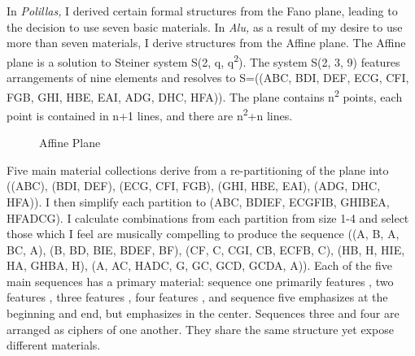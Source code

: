 In \textit{Polillas,} I derived certain formal structures from the Fano plane, leading to the decision to use seven basic materials. In \textit{Alu,} as a result of my desire to use more than seven materials, I derive structures from the Affine plane. The Affine plane is a solution to Steiner system S(2, q, q\textsuperscript{2}). The system S(2, 3, 9) features arrangements of nine elements and resolves to S=((ABC, BDI, DEF, ECG, CFI, FGB, GHI, HBE, EAI, ADG, DHC, HFA)). The plane contains n\textsuperscript{2} points, each point is contained in n+1 lines, and there are n\textsuperscript{2}+n lines.

\begin{figure}[H]
    \centering
{}
    \caption{Affine Plane}
    \label{fig:affine-plane}
\end{figure}

Five main material collections derive from a re-partitioning of the plane into ((ABC), (BDI, DEF), (ECG, CFI, FGB), (GHI, HBE, EAI), (ADG, DHC, HFA)). I then simplify each partition to (ABC, BDIEF, ECGFIB, GHIBEA, HFADCG). I calculate combinations from each partition from size 1-4 and select those which I feel are musically compelling to produce the sequence ((A, B, A, BC, A), (B, BD, BIE, BDEF, BF), (CF, C, CGI, CB, ECFB, C), (HB, H, HIE, HA, GHBA, H), (A, AC, HADC, G, GC, GCD, GCDA, A)). Each of the five main sequences has a primary material: sequence one primarily features , two features , three features , four features , and sequence five emphasizes  at the beginning and end, but emphasizes  in the center. Sequences three and four are arranged as ciphers of one another. They share the same structure yet expose different materials.

